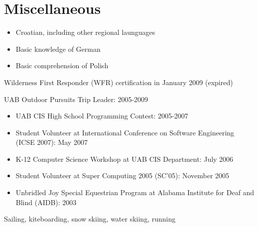 \documentclass{article}
\begin{document}
%
%

\vspace{\parskip}
\section{Miscellaneous}
\begin{description}[widest=Medical Certification]
    \item[Foreign Languages] 
    \begin{itemize}
        \item Croatian, including other regional launguages
        \item Basic knowledge of German
        \item Basic comprehension of Polish
    \end{itemize}
    \item[Medical Certification] Wilderness First Responder (WFR) certification in January 2009 (expired)
    \item[Student Leadership] UAB Outdoor Pursuits Trip Leader: 2005-2009
    \item[Volunteer] 
    \begin{itemize}
        \item UAB CIS High School Programming Contest: 2005-2007
        \item Student Volunteer at International Conference on Software Engineering (ICSE 2007): May 2007
        \item K-12 Computer Science Workshop at UAB CIS Department: July 2006
        \item Student Volunteer at Super Computing 2005 (SC’05): November 2005
        \item Unbridled Joy Special Equestrian Program at Alabama Institute for Deaf and Blind (AIDB): 2003
    \end{itemize}
    \item[Hobbies] Sailing, kiteboarding, snow skiing, water skiing, running
\end{description}
\end{document}
